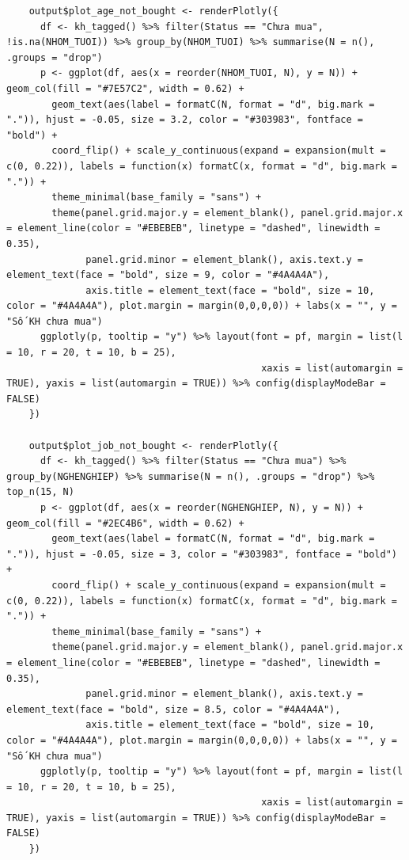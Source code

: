 \documentclass[12pt, a4paper]{article}
\begin{document}
\begin{lstlisting}
    output$plot_age_not_bought <- renderPlotly({
      df <- kh_tagged() %>% filter(Status == "Chưa mua", !is.na(NHOM_TUOI)) %>% group_by(NHOM_TUOI) %>% summarise(N = n(), .groups = "drop")
      p <- ggplot(df, aes(x = reorder(NHOM_TUOI, N), y = N)) + geom_col(fill = "#7E57C2", width = 0.62) +
        geom_text(aes(label = formatC(N, format = "d", big.mark = ".")), hjust = -0.05, size = 3.2, color = "#303983", fontface = "bold") +
        coord_flip() + scale_y_continuous(expand = expansion(mult = c(0, 0.22)), labels = function(x) formatC(x, format = "d", big.mark = ".")) +
        theme_minimal(base_family = "sans") +
        theme(panel.grid.major.y = element_blank(), panel.grid.major.x = element_line(color = "#EBEBEB", linetype = "dashed", linewidth = 0.35),
              panel.grid.minor = element_blank(), axis.text.y = element_text(face = "bold", size = 9, color = "#4A4A4A"),
              axis.title = element_text(face = "bold", size = 10, color = "#4A4A4A"), plot.margin = margin(0,0,0,0)) + labs(x = "", y = "Số KH chưa mua")
      ggplotly(p, tooltip = "y") %>% layout(font = pf, margin = list(l = 10, r = 20, t = 10, b = 25),
                                             xaxis = list(automargin = TRUE), yaxis = list(automargin = TRUE)) %>% config(displayModeBar = FALSE)
    })

    output$plot_job_not_bought <- renderPlotly({
      df <- kh_tagged() %>% filter(Status == "Chưa mua") %>% group_by(NGHENGHIEP) %>% summarise(N = n(), .groups = "drop") %>% top_n(15, N)
      p <- ggplot(df, aes(x = reorder(NGHENGHIEP, N), y = N)) + geom_col(fill = "#2EC4B6", width = 0.62) +
        geom_text(aes(label = formatC(N, format = "d", big.mark = ".")), hjust = -0.05, size = 3, color = "#303983", fontface = "bold") +
        coord_flip() + scale_y_continuous(expand = expansion(mult = c(0, 0.22)), labels = function(x) formatC(x, format = "d", big.mark = ".")) +
        theme_minimal(base_family = "sans") +
        theme(panel.grid.major.y = element_blank(), panel.grid.major.x = element_line(color = "#EBEBEB", linetype = "dashed", linewidth = 0.35),
              panel.grid.minor = element_blank(), axis.text.y = element_text(face = "bold", size = 8.5, color = "#4A4A4A"),
              axis.title = element_text(face = "bold", size = 10, color = "#4A4A4A"), plot.margin = margin(0,0,0,0)) + labs(x = "", y = "Số KH chưa mua")
      ggplotly(p, tooltip = "y") %>% layout(font = pf, margin = list(l = 10, r = 20, t = 10, b = 25),
                                             xaxis = list(automargin = TRUE), yaxis = list(automargin = TRUE)) %>% config(displayModeBar = FALSE)
    })


\end{lstlisting}
\end{document}
